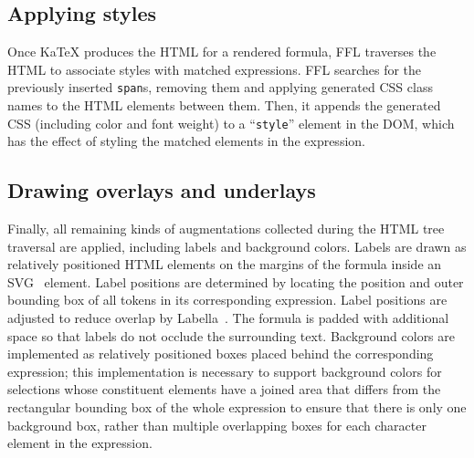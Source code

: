 \subsection{Applying styles}
Once KaTeX produces the HTML for a rendered formula, FFL traverses the HTML to associate styles with matched expressions. FFL searches for the previously inserted \texttt{span}s, removing them and applying generated CSS class names to the HTML elements between them. Then, it appends the generated CSS (including color and font weight) to a ``\texttt{style}'' element in the DOM, which has the effect of styling the matched elements in the expression.


\subsection{Drawing overlays and underlays}\label{sec:overlays}
Finally, all remaining kinds of augmentations collected during the HTML tree traversal are applied, including labels and background colors. Labels are drawn as relatively positioned HTML elements on the margins of the formula inside an SVG~\cite{tool:svg} element. Label positions are determined by locating the position and outer bounding box of all tokens in its corresponding expression. Label positions are adjusted to reduce overlap by Labella~\cite{tool:labella}. The formula is padded with additional space so that labels do not occlude the surrounding text. Background colors are implemented as relatively positioned boxes placed behind the corresponding expression; this implementation is necessary to support background colors for selections whose constituent elements have a joined area that differs from the rectangular bounding box of the whole expression to ensure that there is only one background box, rather than multiple overlapping boxes for each character element in the expression.


